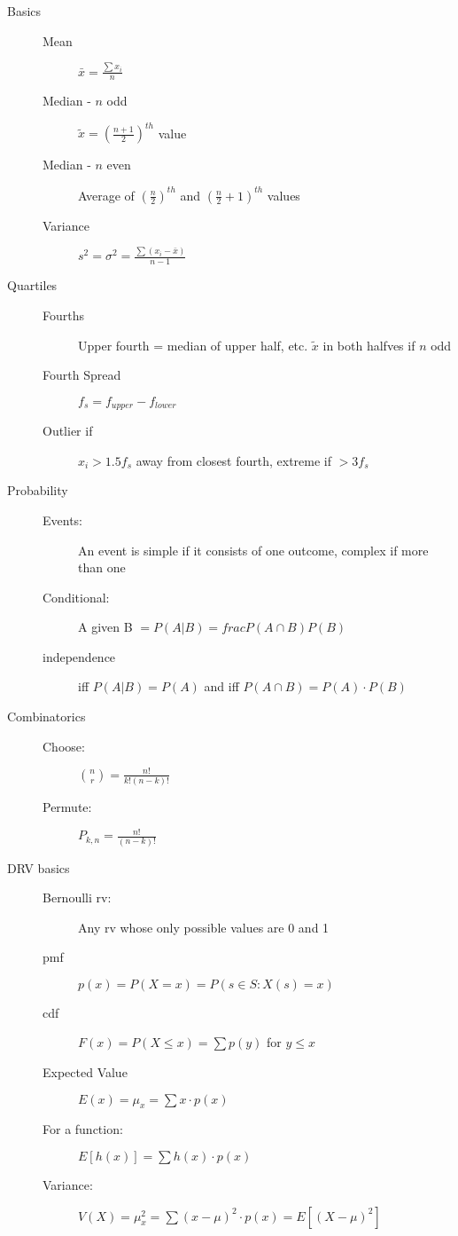 \documentclass[12pt]{letter}
\begin{document}
\begin{multicols}{2}
\begin{description}
  \item[Basics]
    \begin{description}
    \item[Mean] $\bar{x} = \frac{\sum x_i}{n}$
    \item[Median - $n$ odd] $\tilde{x} = \left( \frac{n+1}{2} \right)^{th}$ value
    \item[Median - $n$ even] Average of $\left( \frac{n}{2} \right)^{th}$ and $\left( \frac{n}{2} + 1\right)^{th}$ values
    \item[Variance] $s^2 = \sigma^2 = \frac{\sum(x_i - \bar{x})}{n-1}$
    \end{description}

  \item[Quartiles]
    \begin{description}
    \item[Fourths] Upper fourth = median of upper half, etc.  $\tilde{x}$ in both halfves if $n$ odd
    \item[Fourth Spread] $f_s = f_{upper} - f_{lower}$
    \item[Outlier if] $x_i > 1.5f_s$ away from closest fourth, extreme if $> 3f_s$  
    \end{description}

  \item[Probability]
    \begin{description}
    \item[Events:] An event is simple if it consists of one outcome, complex if more than one
    \item[Conditional:] A given B $ = P(A|B) = frac{P(A \cap B)}{P(B)}$
    \item[independence] iff $P(A|B) = P(A)$ and iff $P(A \cap B) = P(A)\cdot P(B)$
    \end{description}

  \item[Combinatorics]
    \begin{description}
    \item[Choose:] ${n \choose r} = \frac{n!}{k!(n-k)!}$
    \item[Permute:] $P_{k,n} = \frac{n!}{(n-k)!}$
    \end{description}

  \item[DRV basics]
    \begin{description}
    \item[Bernoulli rv:] Any rv whose only possible values are 0 and 1
    \item[pmf] $p(x) = P(X=x) = P(s \in S: X(s) = x)$
    \item[cdf] $F(x) = P(X \leq x) = \sum p(y) $ for $y \leq x$
    \item[Expected Value] $E(x) = \mu_x = \sum x \cdot p(x)$
    \item[For a function:] $E[h(x)] = \sum h(x) \cdot p(x)$
    \item[Variance:] $V(X) = \mu_x^2 = \sum (x - \mu)^2 \cdot p(x) = E[(X-\mu)^2]$
    \end{description}


\end{description}
\end{multicols}
\end{document}
